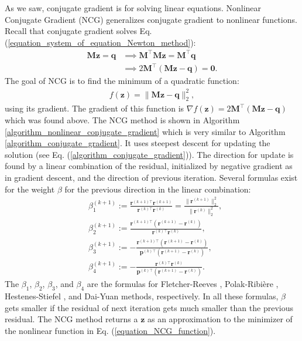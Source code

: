 \documentclass[lang=cn,10pt]{gorgeousnbook}
\numberwithin{equation}{section}%
\numberwithin{figure}{section}%
\begin{document}
As we saw, conjugate gradient is for solving linear equations. 
Nonlinear Conjugate Gradient (NCG) generalizes conjugate gradient to nonlinear functions. 
Recall that conjugate gradient solves Eq. (\ref{equation_system_of_equation_Newton_method}):
\begin{align*}
\boldsymbol{M z} = \boldsymbol{q} &\implies \boldsymbol{M}^\top\boldsymbol{M z} = \boldsymbol{M}^\top\boldsymbol{q} \\
&\implies 2\boldsymbol{M}^\top(\boldsymbol{M z} - \boldsymbol{q}) = \boldsymbol{0}.
\end{align*}
The goal of NCG is to find the minimum of a quadratic function:
\begin{align}\label{equation_NCG_function}
f(\boldsymbol{z}) = \|\boldsymbol{M z} - \boldsymbol{q}\|_2^2,
\end{align}
using its gradient. The gradient of this function is $\nabla f(\boldsymbol{z}) = 2\boldsymbol{M}^\top(\boldsymbol{M z} - \boldsymbol{q})$ which was found above. 
The NCG method is shown in Algorithm \ref{algorithm_nonlinear_conjugate_gradient} which is very similar to Algorithm \ref{algorithm_conjugate_gradient}. It uses steepest descent for updating the solution (see Eq. (\ref{algorithm_conjugate_gradient})). 
The direction for update is found by a linear combination of the residual, initialized by negative gradient as in gradient descent, and the direction of previous iteration.
Several formulas exist for the weight $\beta$ for the previous direction in the linear combination:
\begin{equation}\label{equation_NCG_beta}
\begin{aligned}
& \beta_1^{(k+1)} := \frac{\boldsymbol{r}^{(k+1)\top} \boldsymbol{r}^{(k+1)}}{\boldsymbol{r}^{(k)\top} \boldsymbol{r}^{(k)}} = \frac{\|\boldsymbol{r}^{(k+1)}\|_2^2}{\|\boldsymbol{r}^{(k)}\|_2^2}, \\
& \beta_2^{(k+1)} := \frac{\boldsymbol{r}^{(k+1)\top} (\boldsymbol{r}^{(k+1)} - \boldsymbol{r}^{(k)})}{\boldsymbol{r}^{(k)\top} \boldsymbol{r}^{(k)}}, \\
& \beta_3^{(k+1)} := -\frac{\boldsymbol{r}^{(k+1)\top} (\boldsymbol{r}^{(k+1)} - \boldsymbol{r}^{(k)})}{\boldsymbol{p}^{(k)\top} (\boldsymbol{r}^{(k+1)} - \boldsymbol{r}^{(k)})}, \\
& \beta_4^{(k+1)} := -\frac{\boldsymbol{r}^{(k)\top} \boldsymbol{r}^{(k)}}{\boldsymbol{p}^{(k)\top} (\boldsymbol{r}^{(k+1)} - \boldsymbol{r}^{(k)})}.
\end{aligned}
\end{equation}
The $\beta_1$, $\beta_2$, $\beta_3$, and $\beta_4$ are the formulas for Fletcher-Reeves \cite{fletcher1964function}, Polak-Ribi{\`e}re \cite{polak1969note}, Hestenes-Stiefel \cite{hestenes1952methods}, and Dai-Yuan \cite{dai1999nonlinear} methods, respectively. 
In all these formulas, $\beta$ gets smaller if the residual of next iteration gets much smaller than the previous residual. 
The NCG method returns a $\boldsymbol{z}$ as an approximation to the minimizer of the nonlinear function in Eq. (\ref{equation_NCG_function}). 
\end{document}
